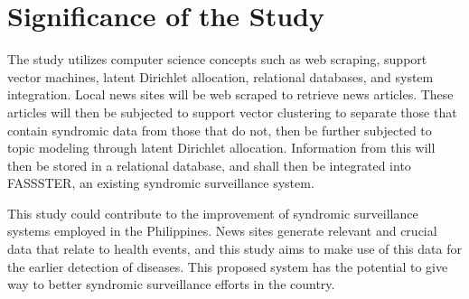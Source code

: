 \section{Significance of the Study}

The study utilizes computer science concepts such as web scraping, support vector machines, latent Dirichlet allocation, relational databases, and system integration. Local news sites will be web scraped to retrieve news articles. These articles will then be subjected to support vector clustering to separate those that contain syndromic data from those that do not, then be further subjected to topic modeling through latent Dirichlet allocation. Information from this will then be stored in a relational database, and shall then be integrated into FASSSTER, an existing syndromic surveillance system.

This study could contribute to the improvement of syndromic surveillance systems employed in the Philippines. News sites generate relevant and crucial data that relate to health events, and this study aims to make use of this data for the earlier detection of diseases. This proposed system has the potential to give way to better syndromic surveillance efforts in the country. 